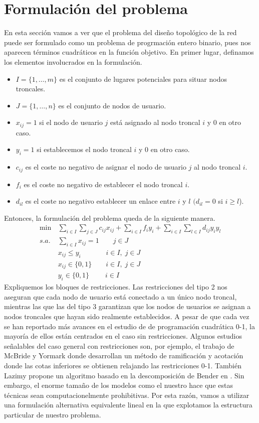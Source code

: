 \documentclass[twoside,12pt]{article}
\begin{document}
\section{Formulación del problema}
En esta sección vamos a ver que el problema del diseño topológico de la red puede ser formulado como un problema de progrmación entero binario, pues nos aparecen términos cuadráticos en la función objetivo. En primer lugar, definamos los elementos involucrados en la formulación.
\begin{itemize}
\item $I=\{1,\dotsc,m\}$ es el conjunto de lugares potenciales para situar nodos troncales.
\item $J=\{1,\dotsc,n\}$ es el conjunto de nodos de usuario.
\item $x_{ij}=1$ si el nodo de usuario $j$ está asignado al nodo troncal $i$ y $0$ en otro caso.
\item $y_i =1$ si establecemos el nodo troncal $i$ y $0$ en otro caso.
\item $c_{ij}$ es el coste no negativo de asignar el nodo de usuario $j$ al nodo troncal $i$.
\item $f_i$ es el coste no negativo de establecer el nodo troncal $i$. 
\item $d_{il}$ es el coste no negativo establecer un enlace entre $i$ y $l$ $(d_{il} = 0$ si $i\geq l$).
\end{itemize}
Entonces, la formulación del problema queda de la siguiente manera.
\begin{align}
\min \,& \sum_{i\in I} \sum_{j\in J} c_{ij}x_{ij} + \sum_{i\in I} f_i y_i + \sum_{i \in I}\sum_{l \in I} d_{ij}y_iy_l\\
s.a.\,& \sum_{i\in I} x_{ij} = 1 \qquad  j \in J\\
& x_{ij}\leq y_i \quad\;\;\qquad i \in I,\; j\in J\\
&x_{ij}\in\{0,1\} \qquad i \in I,\; j\in J\\
&y_i\in\{0,1\} \qquad \;i\in I
\end{align}
Expliquemos los bloques de restricciones. Las restricciones del tipo 2 nos aseguran que cada nodo de usuario está conectado a un único nodo troncal, mientras las que las del tipo 3 garantizan que los nodos de usuarios se asignan a nodos troncales que hayan sido realmente establecidos. A pesar de que cada vez se han reportado más avances en el estudio de de programación cuadrática 0-1, la mayoría de ellos están centrados en el caso sin restricciones. Algunos estudios señalables del caso general con restricciones son, por ejemplo, el trabajo de McBride y Yormark \cite{mcbride} donde desarrollan un método  de ramificación y acotación donde las cotas inferiores se obtienen relajando las restricciones 0-1. También Lazimy propone un algoritmo basado en la descomposición de Bender en \cite{lazi}. Sin embargo, el enorme tamaño de los modelos como el nuestro hace que estas técnicas sean computacionelmente prohibitivas. Por esta razón, vamos a utilizar una formulación alternativa equivalente lineal en la que explotamos la estructura particular de nuestro problema.
\end{document}
